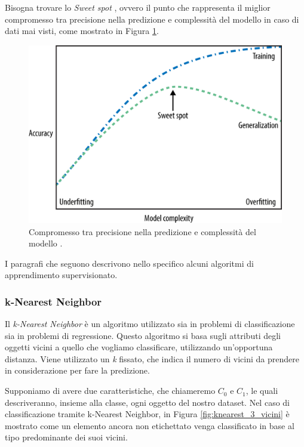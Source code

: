 \documentclass[a4paper,12pt]{report}
\begin{document}

Bisogna trovare lo \textit{Sweet spot} \cite{machine_learning_oreilly}, ovvero il punto che rappresenta il miglior compromesso tra precisione nella predizione e complessità del modello in caso di dati mai visti, come mostrato in Figura \ref{fig:sweet_spot}.
\begin{figure}[ht]
    \centering
    \includegraphics[scale = 0.35]{images/sweet_spot.png}
    \caption{Compromesso tra precisione nella predizione e complessità del modello \cite{figure_copyright}.}
    \label{fig:sweet_spot}

\end{figure}


\bigskip
I paragrafi che seguono descrivono nello specifico alcuni algoritmi di apprendimento supervisionato.

\subsubsection{k-Nearest Neighbor}

Il \textit{k-Nearest Neighbor} è un algoritmo utilizzato sia in problemi di classificazione sia in problemi di regressione. 
Questo algoritmo si basa sugli attributi degli oggetti vicini a quello che vogliamo classificare, utilizzando un'opportuna distanza. Viene utilizzato un \textit{k} fissato, che indica il numero di vicini da prendere in considerazione per fare la predizione.

Supponiamo di avere due  caratteristiche, che chiameremo $C_{0}$ e $C_{1}$, le quali descriveranno, insieme alla classe, ogni oggetto del nostro dataset. Nel caso di classificazione tramite k-Nearest Neighbor, in Figura \ref{fig:knearest_3_vicini} è mostrato come un elemento ancora non etichettato venga classificato in base al tipo predominante dei suoi vicini.
\end{document}
